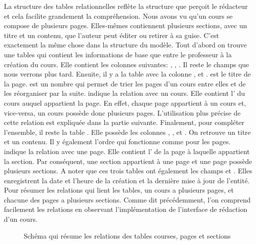 \documentclass[letterpaper,10pt,oneside]{sphinxmanual}
\begin{document}
La structure des tables relationnelles reflète la structure que perçoit le rédacteur et cela facilite grandement la compréhension. Nous avons vu qu'un cours se compose de plusieurs pages. Elles-mêmes contiennent plusieurs sections, avec un titre et un contenu, que l'auteur peut éditer ou retirer à sa guise. C'est exactement la même chose dans la structure du modèle. Tout d'abord on trouve une tables  qui contient les informations de base que entre le professeur à la création du cours. Elle contient les colonnes suivantes: , , . Il reste le champs  que nous verrons plus tard. Ensuite, il y a la table  avec la colonne ,  et .  est le titre de la page.  est un nombre qui permet de trier les pages d'un cours entre elles et de les réorganiser par la suite.  indique la relation avec un cours. Elle contient l' du cours auquel appartient la page. En effet, chaque page appartient à un cours et, vice-versa, un cours possède donc plusieurs pages. L'utilisation plus précise de cette relation est expliquée dans la partie suivante. Finalement, pour compléter l'ensemble, il reste la table . Elle possède les colonnes , ,  et . On retrouve un titre et un contenu. Il y également l'ordre qui fonctionne comme pour les pages.  indique la relation avec une page. Elle contient l' de la page à laquelle appartient la section. Par conséquent, une section appartient à une page et une page possède plusieurs sections. A noter que ces trois tables ont également les champs  et . Elles enregistrent la date et l'heure de la création et la dernière mise à jour de l'entité. Pour résumer les relations qui lient les tables, un cours a plusieurs pages, et chacune des pages a plusieurs sections. Comme dit précédemment, l'on comprend facilement les relations en observant l'implémentation de l'interface de rédaction d'un cours.
\begin{figure}[htbp]
\centering
\capstart

\caption{Schéma qui résume les relations des tables courses, pages et sections}\end{figure}
\end{document}
